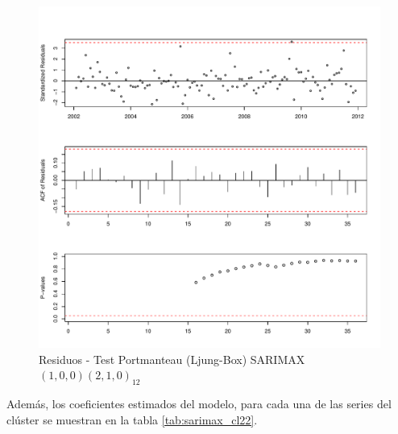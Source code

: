 \documentclass[12pt,oneside]{book}\usepackage[]{graphicx}\usepackage[]{color}
\makeatletter
\def\maxwidth{ %
  \ifdim\Gin@nat@width>\linewidth
    \linewidth
  \else
    \Gin@nat@width
  \fi
}
\newenvironment{knitrout}{}{} %
\theoremstyle{definition} %
\makeatother
\begin{document}
\begin{knitrout}
\color{fgcolor}\begin{figure}[h]

{\centering \includegraphics[width=\maxwidth]{figure/unnamed-chunk-102-1} 

}

\caption[Residuos - Test Portmanteau (Ljung-Box) SARIMAX$(1,0,0)(2,1,0)_{12}$]{Residuos - Test Portmanteau (Ljung-Box) SARIMAX$(1,0,0)(2,1,0)_{12}$}\label{fig:unnamed-chunk-102}
\end{figure}


\end{knitrout}


Además, los coeficientes estimados del modelo, para cada una de las series del clúster se muestran en la tabla \ref{tab:sarimax_cl22}.
\end{document}
